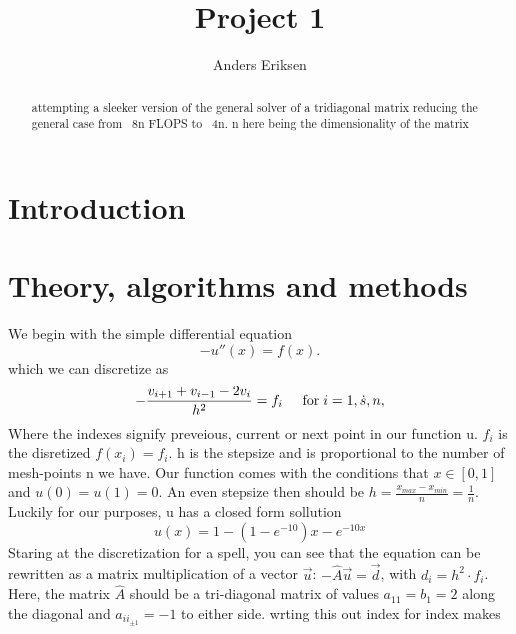 \documentclass[10pt,showpacs,preprintnumbers,footinbib,amsmath,amssymb,aps,prl,twocolumn,groupedaddress,superscriptaddress,showkeys]{revtex4-1}
\begin{document}
\title{Project 1}
\author{Anders Eriksen}
\begin{abstract}
attempting a sleeker version of the general solver of a tridiagonal matrix reducing the general case from ~8n FLOPS to ~4n. n here being the dimensionality of the matrix
\end{abstract}
\maketitle

\section{Introduction}

\section{Theory, algorithms and methods}
We begin with the simple differential equation 
\begin{equation*}
-u''(x) = f(x).
\end{equation*}
which we can discretize as 
\begin{equation*}
   -\frac{v_{i+1}+v_{i-1}-2v_i}{h^2} = f_i  \hspace{0.5cm} \mathrm{for} \hspace{0.1cm} i=1,\dot    s, n,
\end{equation*}
Where the indexes signify preveious, current or next point in our function u. $f_i$ is the disretized $f(x_i) = f_i$. h is the stepsize and is proportional to the number of mesh-points n we have. Our function comes with the conditions that $x \in [0,1]$ and $u(0)=u(1)=0$. An even stepsize then should be $h = \frac{x_{max}- x_{min}}{n} = \frac{1}{n}$. Luckily for our purposes, u has a closed form sollution 
\begin{equation*}
	u(x) = 1-(1-e^{-10})x-e^{-10x}
\end{equation*}
Staring at the discretization for a spell, you can see that the equation can be rewritten as a matrix multiplication of a vector $\vec{u}$: $-\hat{A}\vec{u}=\vec{d}$, with $d_i = h^2\cdot f_i$.  Here, the matrix $\hat{A}$ should be a tri-diagonal matrix of values $a_{11} = b_1 = 2$ along the diagonal and $a_{ii_{\pm 1}} = -1$ to either side. wrting this out index for index makes
\end{document}
